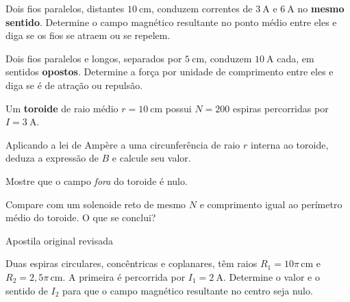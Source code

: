 \blocoaprofundamento
\begin{questao}[3]{}

Dois fios paralelos, distantes $\SI{10}{\centi\meter}$, conduzem correntes de
$\SI{3}{\ampere}$ e $\SI{6}{\ampere}$ no \textbf{mesmo sentido}. Determine o campo
magnético resultante no ponto médio entre eles e diga se os fios se atraem ou se
repelem.


\end{questao}
\begin{questao}[3]{}

Dois fios paralelos e longos, separados por $\SI{5}{\centi\meter}$, conduzem
$\SI{10}{\ampere}$ cada, em sentidos \textbf{opostos}. Determine a força por
unidade de comprimento entre eles e diga se é de atração ou repulsão.


\end{questao}
\begin{questao}[3]{}

Um \textbf{toroide} de raio médio $r = \SI{10}{\centi\meter}$ possui $N = 200$
espiras percorridas por $I = \SI{3}{\ampere}$.
\begin{itensq}
\item Aplicando a lei de Ampère a uma circunferência de raio $r$ interna ao
      toroide, deduza a expressão de $B$ e calcule seu valor.
\item Mostre que o campo \emph{fora} do toroide é nulo.
\item Compare com um solenoide reto de mesmo $N$ e comprimento igual ao
      perímetro médio do toroide. O que se conclui?
\end{itensq}


\end{questao}
\begin{questao}[3]{Apostila original revisada}

Duas espiras circulares, concêntricas e coplanares, têm raios
$R_1=10\pi\,\si{\centi\metre}$ e $R_2=2{,}5\pi\,\si{\centi\metre}$. A primeira é
percorrida por $I_1=\SI{2}{\ampere}$. Determine o valor e o sentido de $I_2$ para
que o campo magnético resultante no centro seja nulo.


\end{questao}

